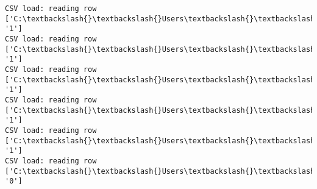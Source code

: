 \documentclass[11pt]{article}
\begin{document}
\begin{Verbatim}[commandchars=\\\{\}]
CSV load: reading row ['C:\textbackslash{}\textbackslash{}Users\textbackslash{}\textbackslash{}AbhishekGangadhar\textbackslash{}\textbackslash{}Downloads\textbackslash{}\textbackslash{}ActionRecog\textbackslash{}\textbackslash{}ActionRecog\textbackslash{}\textbackslash{}DataSets\textbackslash{}\textbackslash{}UCF11\textbackslash{}\textbackslash{}action\_youtube\_naudio\textbackslash{}\textbackslash{}golf\_swing\textbackslash{}\textbackslash{}v\_golf\_01\textbackslash{}\textbackslash{}v\_golf\_01\_06.avi', '1']
CSV load: reading row ['C:\textbackslash{}\textbackslash{}Users\textbackslash{}\textbackslash{}AbhishekGangadhar\textbackslash{}\textbackslash{}Downloads\textbackslash{}\textbackslash{}ActionRecog\textbackslash{}\textbackslash{}ActionRecog\textbackslash{}\textbackslash{}DataSets\textbackslash{}\textbackslash{}UCF11\textbackslash{}\textbackslash{}action\_youtube\_naudio\textbackslash{}\textbackslash{}golf\_swing\textbackslash{}\textbackslash{}v\_golf\_13\textbackslash{}\textbackslash{}v\_golf\_13\_01.avi', '1']
CSV load: reading row ['C:\textbackslash{}\textbackslash{}Users\textbackslash{}\textbackslash{}AbhishekGangadhar\textbackslash{}\textbackslash{}Downloads\textbackslash{}\textbackslash{}ActionRecog\textbackslash{}\textbackslash{}ActionRecog\textbackslash{}\textbackslash{}DataSets\textbackslash{}\textbackslash{}UCF11\textbackslash{}\textbackslash{}action\_youtube\_naudio\textbackslash{}\textbackslash{}golf\_swing\textbackslash{}\textbackslash{}v\_golf\_13\textbackslash{}\textbackslash{}v\_golf\_13\_02.avi', '1']
CSV load: reading row ['C:\textbackslash{}\textbackslash{}Users\textbackslash{}\textbackslash{}AbhishekGangadhar\textbackslash{}\textbackslash{}Downloads\textbackslash{}\textbackslash{}ActionRecog\textbackslash{}\textbackslash{}ActionRecog\textbackslash{}\textbackslash{}DataSets\textbackslash{}\textbackslash{}UCF11\textbackslash{}\textbackslash{}action\_youtube\_naudio\textbackslash{}\textbackslash{}golf\_swing\textbackslash{}\textbackslash{}v\_golf\_13\textbackslash{}\textbackslash{}v\_golf\_13\_03.avi', '1']
CSV load: reading row ['C:\textbackslash{}\textbackslash{}Users\textbackslash{}\textbackslash{}AbhishekGangadhar\textbackslash{}\textbackslash{}Downloads\textbackslash{}\textbackslash{}ActionRecog\textbackslash{}\textbackslash{}ActionRecog\textbackslash{}\textbackslash{}DataSets\textbackslash{}\textbackslash{}UCF11\textbackslash{}\textbackslash{}action\_youtube\_naudio\textbackslash{}\textbackslash{}golf\_swing\textbackslash{}\textbackslash{}v\_golf\_13\textbackslash{}\textbackslash{}v\_golf\_13\_04.avi', '1']
CSV load: reading row ['C:\textbackslash{}\textbackslash{}Users\textbackslash{}\textbackslash{}AbhishekGangadhar\textbackslash{}\textbackslash{}Downloads\textbackslash{}\textbackslash{}ActionRecog\textbackslash{}\textbackslash{}ActionRecog\textbackslash{}\textbackslash{}DataSets\textbackslash{}\textbackslash{}UCF11\textbackslash{}\textbackslash{}action\_youtube\_naudio\textbackslash{}\textbackslash{}biking\textbackslash{}\textbackslash{}v\_biking\_18\textbackslash{}\textbackslash{}v\_biking\_18\_01.avi', '0']

\end{Verbatim}
\end{document}
